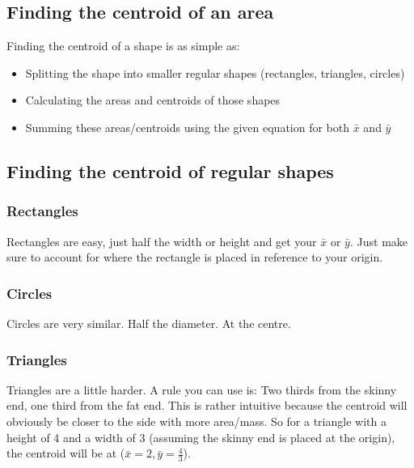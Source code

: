 \documentclass[a4paper, 12pt]{article}
\begin{document}
\subsection{Finding the centroid of an area}
Finding the centroid of a shape is as simple as:
\begin{itemize}
    \item Splitting the shape into smaller regular shapes (rectangles, triangles, circles)
    \item Calculating the areas and centroids of those shapes
    \item Summing these areas/centroids using the given equation for both $\bar{x}$ and $\bar{y}$
\end{itemize}

\subsection{Finding the centroid of regular shapes}
\subsubsection{Rectangles}
Rectangles are easy, just half the width or height and get your $\bar{x}$ or $\bar{y}$.
Just make sure to account for where the rectangle is placed in reference to your origin.
\subsubsection{Circles}
Circles are very similar. Half the diameter. At the centre.
\subsubsection{Triangles}
Triangles are a little harder. 
A rule you can use is:
Two thirds from the skinny end, one third from the fat end. 
This is rather  intuitive because the centroid will obviously be closer to the side with more area/mass. 
So for a triangle with a height of 4 and a width of 3 (assuming the skinny end is placed at the origin),
the centroid will be at ($\bar{x}=2,\bar{y}=\frac{4}{3}$).
\end{document}
